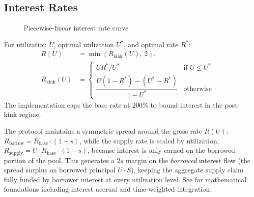 \documentclass[10pt,a4paper,twocolumn]{article}
\begin{document}
\subsection{Interest Rates}
\label{subsec:interest-rates}

\begin{figure}[htbp]
\centering
{}
\caption{Piecewise-linear interest rate curve}
\label{fig:interest-curve}
\end{figure}

\begin{definition}
\label{def:irm}
For utilization $U$, optimal utilization $U^*$, and optimal rate $R^*$:
\begin{equation}
\label{eq:interest-rate}
\begin{aligned}
R(U) &= \min\!\left(R_{\text{kink}}(U),\ 2\right), \\
R_{\text{kink}}(U) &= \begin{cases}
U R^* / U^* & \text{if } U \leq U^* \\[4pt]
\dfrac{U(1{-}R^*) - (U^* - R^*)}{1{-}U^*} & \text{otherwise}
\end{cases}
\end{aligned}
\end{equation}
The implementation caps the base rate at 200\% to bound interest in the post-kink regime.
\end{definition}

The protocol maintains a symmetric spread around the gross rate $R(U)$: $R_{\text{borrow}} = R_{\text{base}} \cdot (1{+}s)$, while the supply rate is scaled by utilization, $R_{\text{supply}} = U \cdot R_{\text{base}} \cdot (1{-}s)$, because interest is only earned on the borrowed portion of the pool. This generates a $2s$ margin on the \emph{borrowed} interest flow (the spread surplus on borrowed principal $U \cdot S$), keeping the aggregate supply claim fully funded by borrower interest at every utilization level. See \cite{mtp} for mathematical foundations including interest accrual and time-weighted integration.
\end{document}
